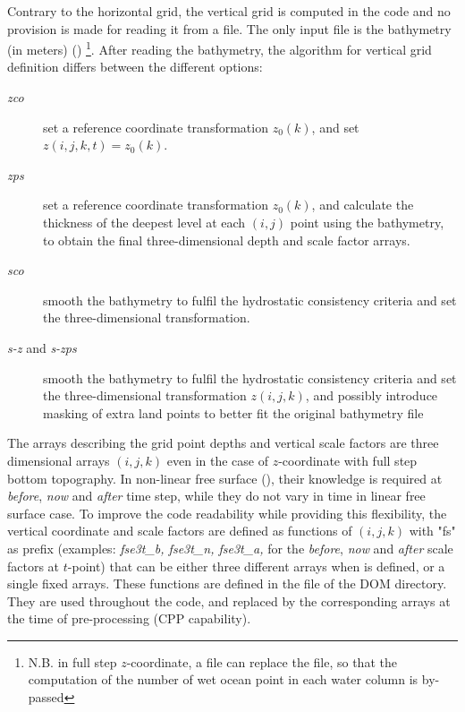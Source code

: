 {Contrary to the horizontal grid, the vertical grid is computed in the code and no 
provision is made for reading it from a file. The only input file is the bathymetry 
(in meters) () 
\footnote{N.B. in full step $z$-coordinate, a  file can replace the 
 file, so that the computation of the number of wet ocean point 
in each water column is by-passed}. 
After reading the bathymetry, the algorithm for vertical grid definition differs 
between the different options:
\begin{description}
\item[\textit{zco}] set a reference coordinate transformation $z_0 (k)$, and set $z(i,j,k,t)=z_0 (k)$.
\item[\textit{zps}] set a reference coordinate transformation $z_0 (k)$, and 
calculate the thickness of the deepest level at each $(i,j)$ point using the 
bathymetry, to obtain the final three-dimensional depth and scale factor arrays.
\item[\textit{sco}] smooth the bathymetry to fulfil the hydrostatic consistency 
criteria and set the three-dimensional transformation.
\item[\textit{s-z} and \textit{s-zps}] smooth the bathymetry to fulfil the hydrostatic 
consistency criteria and set the three-dimensional transformation $z(i,j,k)$, and 
possibly introduce masking of extra land points to better fit the original bathymetry file
\end{description}

The arrays describing the grid point depths and vertical scale factors 
are three dimensional arrays $(i,j,k)$ even in the case of $z$-coordinate with 
full step bottom topography. In non-linear free surface (), their knowledge
is required at \textit{before}, \textit{now} and \textit{after} time step, while they 
do not vary in time in linear free surface case. 
To improve the code readability while providing this flexibility, the vertical coordinate 
and scale factors are defined as functions of 
$(i,j,k)$ with "fs" as prefix (examples: \textit{fse3t\_b, fse3t\_n, fse3t\_a,} 
for the  \textit{before}, \textit{now} and \textit{after} scale factors at $t$-point) 
that can be either three different arrays when  is defined, or a single fixed arrays. 
These functions are defined in the file  of the DOM directory. 
They are used throughout the code, and replaced by the corresponding arrays at 
the time of pre-processing (CPP capability).

}
